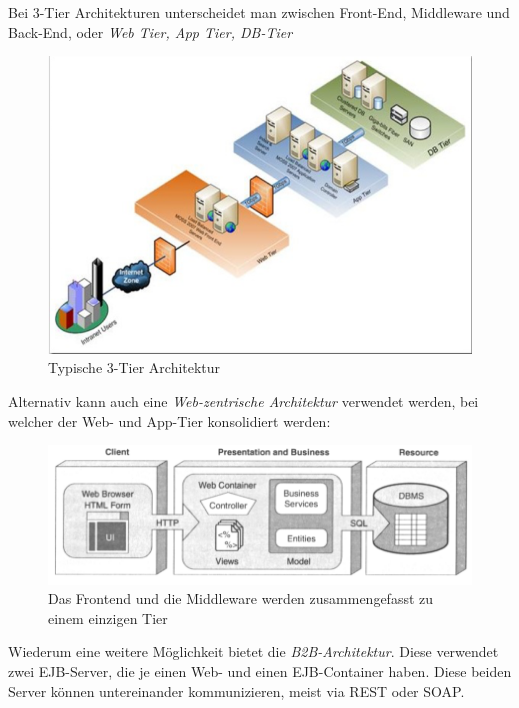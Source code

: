 \documentclass[a4paper, 11pt]{article}
\begin{document}
\vspace{10px}

Bei 3-Tier Architekturen unterscheidet man zwischen Front-End, Middleware und Back-End, oder \textit{Web Tier, App Tier, DB-Tier}

\begin{figure}[htb]
	\centering
	\includegraphics[keepaspectratio=true,height=15\baselineskip]{3-tier.png}
	\caption{Typische 3-Tier Architektur}
	\label{fig:3-tier}
\end{figure}

Alternativ kann auch eine \textit{Web-zentrische Architektur} verwendet werden, bei welcher der Web- und App-Tier konsolidiert werden:

\begin{figure}[htb]
	\centering
	\includegraphics[keepaspectratio=true,height=7.5\baselineskip]{2-tier.png}
	\caption{Das Frontend und die Middleware werden zusammengefasst zu einem einzigen Tier}
	\label{fig:2-tier}
\end{figure}

Wiederum eine weitere Möglichkeit bietet die \textit{B2B-Architektur}. Diese verwendet zwei EJB-Server, die je einen Web- und einen EJB-Container haben. Diese beiden Server können untereinander kommunizieren, meist via REST oder SOAP.
\end{document}
